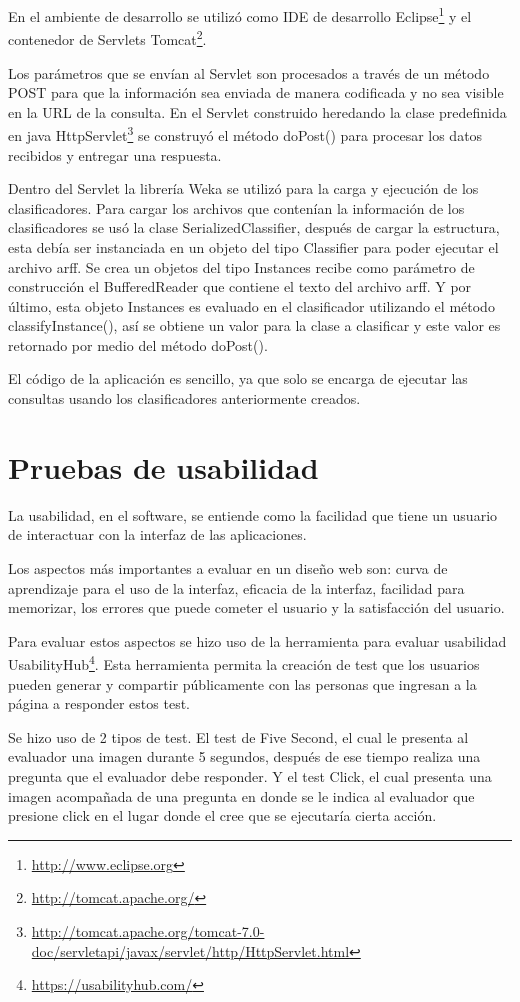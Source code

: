 En el ambiente de desarrollo se utilizó como IDE de desarrollo Eclipse\footnote{\url{http://www.eclipse.org}} y el contenedor de Servlets Tomcat\footnote{\url{http://tomcat.apache.org/}}.

Los parámetros que se envían al Servlet son procesados a través de un método POST para que la información sea enviada de manera codificada y no sea visible en la URL de la consulta. En el Servlet construido heredando la clase predefinida en java HttpServlet\footnote{\url{http://tomcat.apache.org/tomcat-7.0-doc/servletapi/javax/servlet/http/HttpServlet.html}} se construyó el método doPost() para procesar los datos recibidos y entregar una respuesta.

Dentro del Servlet la librería Weka se utilizó para la carga y ejecución de los clasificadores. Para cargar los archivos que contenían la información de los clasificadores se usó la clase SerializedClassifier, después de cargar la estructura, esta debía ser instanciada en un objeto del tipo Classifier para poder ejecutar el archivo arff. Se crea un objetos del tipo Instances recibe como parámetro de construcción el BufferedReader que contiene el texto del archivo arff. Y por último, esta objeto Instances es evaluado en el clasificador utilizando el método classifyInstance(), así se obtiene un valor para la clase a clasificar y este valor es retornado por medio del método doPost().

El código de la aplicación es sencillo, ya que solo se encarga de ejecutar las consultas usando los clasificadores anteriormente creados.
\section{Pruebas de usabilidad}
La usabilidad, en el software, se entiende como la facilidad que tiene un usuario de interactuar con la interfaz de las aplicaciones.

Los aspectos más importantes a evaluar en un diseño web son: curva de aprendizaje para el uso de la interfaz, eficacia de la interfaz, facilidad para memorizar, los errores que puede cometer el usuario y la satisfacción del usuario.

Para evaluar estos aspectos se hizo uso de la herramienta para evaluar usabilidad UsabilityHub\footnote{\url{https://usabilityhub.com/}}. Esta herramienta permita la creación de test que los usuarios pueden generar y compartir públicamente con las personas que ingresan a la página a responder estos test. 

Se hizo uso de 2 tipos de test. El test de Five Second, el cual le presenta al evaluador una imagen durante 5 segundos, después de ese tiempo realiza una pregunta que el evaluador debe responder. Y el test Click, el cual presenta una imagen acompañada de una pregunta en donde se le indica al evaluador que presione click en el lugar donde el cree que se ejecutaría cierta acción.

